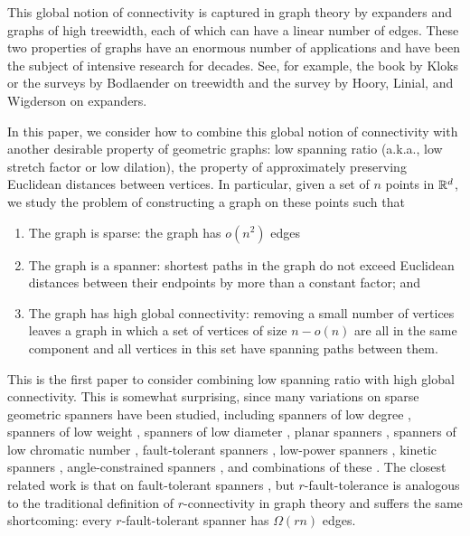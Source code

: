 \documentclass{patmorin}
\begin{document}
This global notion of connectivity is captured in graph theory by
expanders and graphs of high treewidth, each of which can have a linear
number of edges.  These two properties of graphs have an enormous number
of applications and have been the subject of intensive research for
decades.  See, for example, the book by Kloks \cite{k94} or the surveys
by Bodlaender \cite{b98,b07} on treewidth and the survey by Hoory, Linial,
and Wigderson \cite{hlw06} on expanders.

In this paper, we consider how to combine this global notion of
connectivity with another desirable property of geometric graphs:
low spanning ratio (a.k.a., low stretch factor or low dilation),  the
property of approximately preserving Euclidean distances between vertices.
In particular, given a set of $n$ points in $\mathbb{R}^d$, we study the problem
of constructing a graph on these points such that
\begin{enumerate}
  \item The graph is sparse: the graph has $o(n^2)$ edges
  \item The graph is a spanner: shortest paths in the graph do not exceed
  Euclidean distances between their endpoints by more than a constant
  factor; and
  \item The graph has high global connectivity: removing a small number
  of vertices leaves a graph in which a set of vertices of size $n-o(n)$
  are all in the same component and all vertices in this set have
  spanning paths between them.
\end{enumerate}

This is the first paper to consider combining low spanning ratio
with high global connectivity.  This is somewhat surprising, since
many variations on sparse geometric spanners have been studied,
including spanners of low degree \cite{abcghsv08,cc10,s06}, spanners
of low weight \cite{bcfms10,dn97,gln02}, spanners of low diameter
\cite{ams94,ams99}, planar spanners \cite{accdsz96,c89,dj89,kg89},
spanners of low chromatic number \cite{bccmsz09}, fault-tolerant
spanners \cite{abfg09,cz04,lns02,l99}, low-power spanners
\cite{aack11,ss10,wl06}, kinetic spanners \cite{ab11,abg10},
angle-constrained spanners \cite{cs10}, and combinations of these
\cite{admss95,as97,bfrv12,bgs05,bsx09,cc10b}.  The closest related
work is that on fault-tolerant spanners \cite{abfg09,cz04,lns02,l99},
but $r$-fault-tolerance is analogous to the traditional definition
of $r$-connectivity in graph theory and suffers the same shortcoming:
every $r$-fault-tolerant spanner has $\Omega(rn)$ edges.
\end{document}
